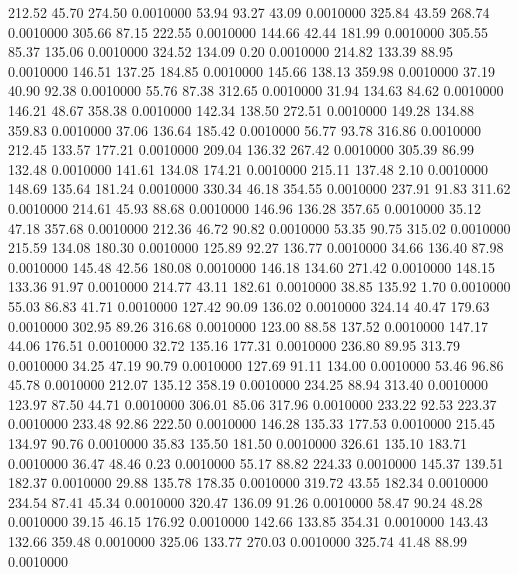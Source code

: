  212.52   45.70  274.50   0.0010000
  53.94   93.27   43.09   0.0010000
 325.84   43.59  268.74   0.0010000
 305.66   87.15  222.55   0.0010000
 144.66   42.44  181.99   0.0010000
 305.55   85.37  135.06   0.0010000
 324.52  134.09    0.20   0.0010000
 214.82  133.39   88.95   0.0010000
 146.51  137.25  184.85   0.0010000
 145.66  138.13  359.98   0.0010000
  37.19   40.90   92.38   0.0010000
  55.76   87.38  312.65   0.0010000
  31.94  134.63   84.62   0.0010000
 146.21   48.67  358.38   0.0010000
 142.34  138.50  272.51   0.0010000
 149.28  134.88  359.83   0.0010000
  37.06  136.64  185.42   0.0010000
  56.77   93.78  316.86   0.0010000
 212.45  133.57  177.21   0.0010000
 209.04  136.32  267.42   0.0010000
 305.39   86.99  132.48   0.0010000
 141.61  134.08  174.21   0.0010000
 215.11  137.48    2.10   0.0010000
 148.69  135.64  181.24   0.0010000
 330.34   46.18  354.55   0.0010000
 237.91   91.83  311.62   0.0010000
 214.61   45.93   88.68   0.0010000
 146.96  136.28  357.65   0.0010000
  35.12   47.18  357.68   0.0010000
 212.36   46.72   90.82   0.0010000
  53.35   90.75  315.02   0.0010000
 215.59  134.08  180.30   0.0010000
 125.89   92.27  136.77   0.0010000
  34.66  136.40   87.98   0.0010000
 145.48   42.56  180.08   0.0010000
 146.18  134.60  271.42   0.0010000
 148.15  133.36   91.97   0.0010000
 214.77   43.11  182.61   0.0010000
  38.85  135.92    1.70   0.0010000
  55.03   86.83   41.71   0.0010000
 127.42   90.09  136.02   0.0010000
 324.14   40.47  179.63   0.0010000
 302.95   89.26  316.68   0.0010000
 123.00   88.58  137.52   0.0010000
 147.17   44.06  176.51   0.0010000
  32.72  135.16  177.31   0.0010000
 236.80   89.95  313.79   0.0010000
  34.25   47.19   90.79   0.0010000
 127.69   91.11  134.00   0.0010000
  53.46   96.86   45.78   0.0010000
 212.07  135.12  358.19   0.0010000
 234.25   88.94  313.40   0.0010000
 123.97   87.50   44.71   0.0010000
 306.01   85.06  317.96   0.0010000
 233.22   92.53  223.37   0.0010000
 233.48   92.86  222.50   0.0010000
 146.28  135.33  177.53   0.0010000
 215.45  134.97   90.76   0.0010000
  35.83  135.50  181.50   0.0010000
 326.61  135.10  183.71   0.0010000
  36.47   48.46    0.23   0.0010000
  55.17   88.82  224.33   0.0010000
 145.37  139.51  182.37   0.0010000
  29.88  135.78  178.35   0.0010000
 319.72   43.55  182.34   0.0010000
 234.54   87.41   45.34   0.0010000
 320.47  136.09   91.26   0.0010000
  58.47   90.24   48.28   0.0010000
  39.15   46.15  176.92   0.0010000
 142.66  133.85  354.31   0.0010000
 143.43  132.66  359.48   0.0010000
 325.06  133.77  270.03   0.0010000
 325.74   41.48   88.99   0.0010000
